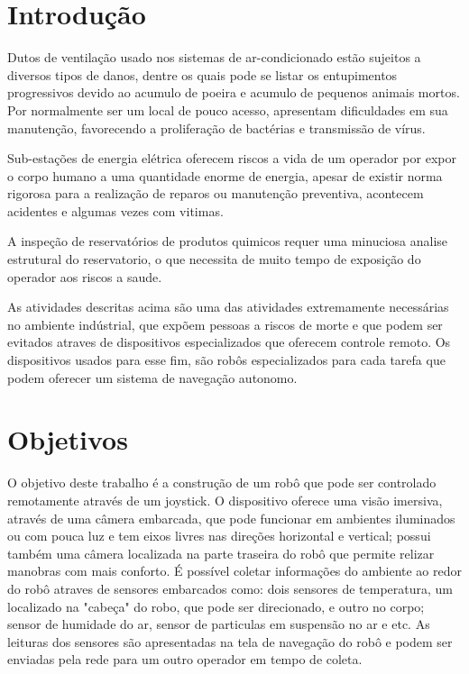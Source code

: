 \documentclass[a4paper,12pt]{article}
\begin{document}
\section{Introdução}
	Dutos de ventilação usado nos sistemas de ar-condicionado estão sujeitos a diversos tipos de danos, dentre os quais pode se listar os entupimentos progressivos devido ao acumulo de poeira e acumulo de pequenos animais mortos. Por normalmente ser um local de pouco acesso, apresentam dificuldades em sua manutenção, favorecendo a proliferação de bactérias e transmissão de vírus.\par
	Sub-estações de energia elétrica oferecem riscos a vida de um operador por expor o corpo humano a uma quantidade enorme de energia, apesar de existir norma rigorosa para a realização de reparos ou manutenção preventiva, acontecem acidentes e algumas vezes com vitimas.\par
	A inspeção de reservatórios de produtos quimicos requer uma minuciosa analise estrutural do reservatorio, o que necessita de muito tempo de exposição do operador aos riscos a saude.\par
	As atividades descritas acima são uma das atividades extremamente necessárias no ambiente indústrial, que expõem pessoas a riscos de morte e que podem ser evitados atraves de dispositivos especializados que oferecem controle remoto. Os dispositivos usados para esse fim, são robôs especializados para cada tarefa que podem oferecer um sistema de navegação autonomo.

\section{Objetivos}
	O objetivo deste trabalho é a construção de um robô que pode ser controlado remotamente através de um joystick. O dispositivo oferece uma visão imersiva, através de uma câmera embarcada, que pode funcionar em ambientes iluminados ou com pouca luz e tem eixos livres nas direções horizontal e vertical; possui também uma câmera localizada na parte traseira do robô que permite relizar manobras com mais conforto. É possível coletar informações do ambiente ao redor do robô atraves de sensores embarcados como: dois sensores de temperatura, um localizado na "cabeça" do robo, que pode ser direcionado, e outro no corpo; sensor de humidade do ar, sensor de particulas em suspensão no ar e etc. As leituras dos sensores são apresentadas na tela de navegação do robô e podem ser enviadas pela rede para um outro operador em tempo de coleta.
\end{document}
